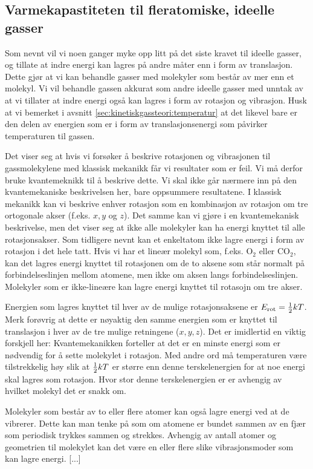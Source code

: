 \subsection{Varmekapastiteten til fleratomiske, ideelle gasser}
Som nevnt vil vi noen ganger myke opp litt på det siste kravet til ideelle gasser, og tillate at indre energi kan lagres på andre måter enn i form av translasjon. Dette gjør at vi kan behandle gasser med molekyler som består av mer enn et molekyl. Vi vil behandle gassen akkurat som andre ideelle gasser med unntak av at vi tillater at indre energi også kan lagres i form av rotasjon og vibrasjon. Husk at vi bemerket i avsnitt \ref{sec:kinetiskgassteori:temperatur} at det likevel bare er den delen av energien som er i form av translasjonsenergi som påvirker temperaturen til gassen.

Det viser seg at hvis vi forsøker å beskrive rotasjonen og vibrasjonen til gassmolekylene med klassisk mekanikk får vi resultater som er feil. Vi må derfor bruke kvantemeknikk til å beskrive dette. Vi skal ikke går nærmere inn på den kvantemekaniske beskrivelsen her, bare oppsummere resultatene. I klassisk mekanikk kan vi beskrive enhver rotasjon som en kombinasjon av rotasjon om tre ortogonale akser (f.eks. $x, y$ og $z$). Det samme kan vi gjøre i en kvantemekanisk beskrivelse, men det viser seg at ikke alle molekyler kan ha energi knyttet til alle rotasjonsakser. Som tidligere nevnt kan et enkeltatom ikke lagre energi i form av rotasjon i det hele tatt. Hvis vi har et lineær molekyl som, f.eks. O$_2$ eller CO$_2$, kan det lagres energi knyttet til rotasjonen om de to aksene som står normalt på forbindelseslinjen mellom atomene, men ikke om aksen langs forbindelseslinjen. Molekyler som er ikke-lineære kan lagre energi knyttet til rotasojn om tre akser.

Energien som lagres knyttet til hver av de mulige rotasjonsaksene er $E_\text{rot} = \frac{1}{2} kT$. Merk forøvrig at dette er nøyaktig den samme energien som er knyttet til translasjon i hver av de tre mulige retningene ($x,y,z$). Det er imidlertid en viktig forskjell her: Kvantemekanikken forteller at det er en minste energi som er nødvendig for å sette molekylet i rotasjon. Med andre ord må temperaturen være tilstrekkelig høy slik at $\frac{1}{2} kT$ er større enn denne terskelenergien for at noe energi skal lagres som rotasjon. Hvor stor denne terskelenergien er er avhengig av hvilket molekyl det er snakk om.

Molekyler som består av to eller flere atomer kan også lagre energi ved at de vibrerer. Dette kan man tenke på som om atomene er bundet sammen av en fjær som periodisk trykkes sammen og strekkes. Avhengig av antall atomer og geometrien til molekylet kan det være en eller flere slike vibrasjonsmoder som kan lagre energi. [...]


